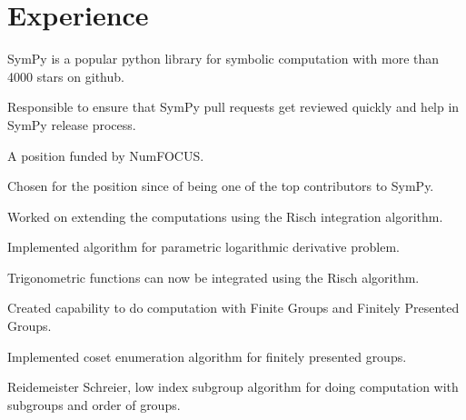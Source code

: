 \documentclass[]{deedy-resume-openfont}
\begin{document}
\begin{minipage}[t]{0.66\textwidth}


\section{Experience}

\vspace{\topsep} %
\vspace{\topsep}
\begin{tightemize}
\item SymPy is a popular python library for symbolic computation with more than 4000 stars on github.
\item Responsible to ensure that SymPy pull requests get reviewed quickly and help in SymPy release process.
\item A position funded by NumFOCUS.
\item Chosen for the position since of being one of the top contributors to SymPy.
\end{tightemize}
\sectionsep

\vspace{\topsep} %
\begin{tightemize}
\item Worked on extending the computations using the Risch integration algorithm.
\item Implemented algorithm for parametric logarithmic derivative problem.
\item Trigonometric functions can now be integrated using the Risch algorithm.
\end{tightemize}
\sectionsep

\vspace{\topsep} %
\begin{tightemize}
\item Created capability to do computation with Finite Groups and Finitely Presented Groups.
\item Implemented coset enumeration algorithm for finitely presented groups.
\item Reidemeister Schreier, low index subgroup algorithm for doing computation with subgroups and order of groups.
\end{tightemize}
\sectionsep


\end{minipage}
\end{document}
